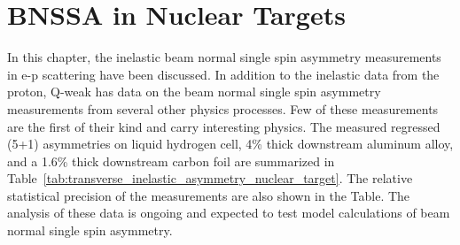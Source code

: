 \section{BNSSA in Nuclear Targets}
\label{BNSSA in Nuclear Targets}

In this chapter, the inelastic beam normal single spin asymmetry measurements in e-p scattering have been discussed. In addition to the inelastic data from the proton, Q-weak has data on the beam normal single spin asymmetry measurements from several other physics processes. Few of these measurements are the first of their kind and carry interesting physics. The measured regressed (5+1) asymmetries on liquid hydrogen cell, 4\% thick downstream aluminum alloy, and a 1.6\% thick downstream carbon foil are summarized in Table~\ref{tab:transverse_inelastic_asymmetry_nuclear_target}. The relative statistical precision of the measurements are also shown in the Table. The analysis of these data is ongoing and expected to test model calculations of beam normal single spin asymmetry.


